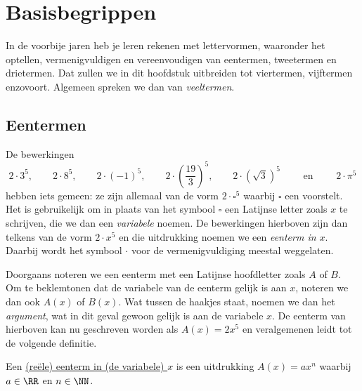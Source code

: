 \documentclass{ximera}
\def\rectoverso{0} %
\def\voetn{0} %
\begin{document}
\renewcommand{\contentsname}{\huge{Inhoud}} 

\setcounter{totaalaantalvoorbladen}{\value{page}}
\ifthenelse{\rectoverso < 1}{}{\addtocounter{totaalaantalvoorbladen}{1}}

\ifthenelse{\voetn < 1}{\DisableFootNotes}{}

\chapter{Basisbegrippen}

In de voorbije jaren heb je leren rekenen met lettervormen, waaronder het optellen, ver\-menigvuldigen en vereenvoudigen van eentermen, tweetermen en drietermen. Dat zullen we in dit hoofdstuk uitbreiden tot viertermen, vijftermen enzovoort. Algemeen spreken we dan van {\em veeltermen}.

\section{Eentermen}

De bewerkingen
\[
2\cdot 3^5, \qquad 2\cdot 8^5, \qquad 2\cdot (-1)^5, \qquad 2\cdot\left(\frac{19}{3}\right)^5, \qquad 2\cdot\left(\sqrt{3}\right)^5 \qquad \text{ en } \qquad 2 \cdot \pi^5
\]
hebben iets gemeen: ze zijn allemaal van de vorm $2\cdot \square^5$ waarbij $\square$ een  voorstelt. Het is gebruikelijk om in plaats van het symbool $\square$ een Latijnse letter zoals $x$ te schrijven, die we dan een {\em variabele} noemen. De bewerkingen hierboven zijn dan telkens van de vorm $2 \cdot x^5$ en die uitdrukking noemen we een {\em eenterm in $x$}. Daarbij wordt het symbool $\cdot$ voor de vermenigvuldiging meestal weggelaten. 

Doorgaans noteren we een eenterm met een Latijnse hoofdletter zoals $A$ of $B$. Om te beklemtonen dat de variabele van de eenterm gelijk is aan $x$, noteren we dan ook $A(x)$ of $B(x)$. Wat tussen de haakjes staat, noemen we dan het {\em argument}, wat in dit geval gewoon gelijk is aan de variabele $x$. De eenterm van hierboven kan nu geschreven worden als $A(x) = 2x^5$ en veralgemenen leidt tot de volgende definitie.

\begin{definition}
Een \underline{(re\"ele) eenterm in (de variabele) $x$} is een uitdrukking $A(x) = ax^n$ waarbij $a \in \RR$ en $n \in \NN$. 
\end{definition}
\end{document}
